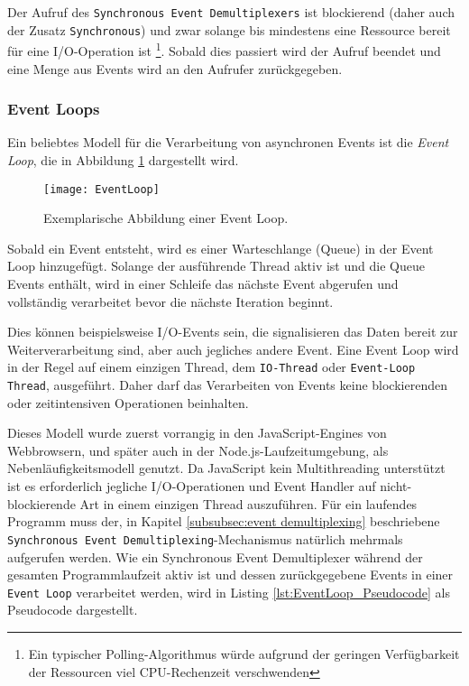 Der Aufruf des \verb|Synchronous Event Demultiplexers| ist blockierend (daher auch der Zusatz \verb|Synchronous|)
und zwar solange bis mindestens eine Ressource bereit für eine I/O-Operation ist
\footnote{Ein typischer Polling-Algorithmus würde aufgrund der geringen Verfügbarkeit der Ressourcen
  viel CPU-Rechenzeit verschwenden}.
Sobald dies passiert wird der Aufruf beendet und eine Menge aus Events wird an den Aufrufer zurückgegeben.

\subsubsection{Event Loops}
\label{subsubsec:event loops}
Ein beliebtes Modell für die Verarbeitung von asynchronen Events ist die \textit{Event Loop}, die in Abbildung \ref{fig:eventloop} dargestellt wird.
\begin{figure}[ht!]
  \centering
  \texttt{[image: EventLoop]}
  \caption{Exemplarische Abbildung einer Event Loop. \parencite[Kapitel 1.7]{Ponge2020}}
  \label{fig:eventloop}
\end{figure}

Sobald ein Event entsteht, wird es einer Warteschlange (Queue) in der Event Loop hinzugefügt.
Solange der ausführende Thread aktiv ist und die Queue Events enthält, wird in einer Schleife das nächste Event
abgerufen und vollständig verarbeitet bevor die nächste Iteration beginnt.

Dies können beispielsweise I/O-Events sein, die signalisieren das Daten bereit zur Weiterverarbeitung sind,
aber auch jegliches andere Event.
Eine Event Loop wird in der Regel auf einem einzigen Thread, dem \verb|IO-Thread| oder \verb|Event-Loop Thread|,
ausgeführt. Daher darf das Verarbeiten von Events keine blockierenden oder zeitintensiven Operationen beinhalten.

Dieses Modell wurde zuerst vorrangig in den JavaScript-Engines von Webbrowsern, und später auch in der Node.js-Laufzeitumgebung,
als Nebenläufigkeitsmodell genutzt.
Da JavaScript kein Multithreading unterstützt \parencite{MozillaEventLoop} ist es erforderlich jegliche I/O-Operationen und
Event Handler auf nicht-blockierende Art in einem einzigen Thread auszuführen.\parencite{NodeJSEventLoop}
Für ein laufendes Programm muss der, in Kapitel \ref{subsubsec:event demultiplexing} beschriebene
\newline
\verb|Synchronous Event Demultiplexing|-Mechanismus natürlich mehrmals aufgerufen werden.
Wie ein Synchronous Event Demultiplexer während der
gesamten Programmlaufzeit aktiv ist und dessen zurückgegebene Events in einer \verb|Event Loop| verarbeitet werden,
wird in Listing \ref{lst:EventLoop_Pseudocode} als Pseudocode dargestellt.
\newline\newline

